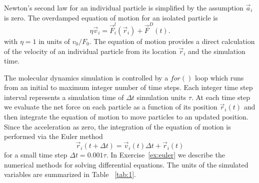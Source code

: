 \documentclass[twocolumn,preprintnumbers,amsmath,amssymb,aps,prx]{revtex4}
\begin{document}
Newton's second law for an individual particle
is simplified
by the assumption $\vec{a}_i$ is zero. %
The overdamped equation of motion for an isolated particle is
\begin{equation}
  \eta \vec{v}_i = \vec{F}^l_{i}(\vec{r}_i) + \vec{F}^{D}(t).
    \label{eq:motion}
\end{equation}
with  $\eta = 1$ in units of $v_0 / F_0$. 
The equation of motion provides a direct calculation of the velocity
of an individual particle from its location $\vec{r}_i$ %
and the simulation time.

The molecular dynamics simulation is controlled by a $for()$ loop
which runs from an initial to maximum integer number of time steps.
Each integer time step interval %
represents a simulation time of $\Delta t$ 
simulation units $\tau$.  %
At each time step
we evaluate the net force on each particle as a function of its position
$\vec{r}_i(t)$
and then integrate
the equation of motion to move particles
to an updated position.
Since the acceleration as zero,
the integration of the equation of motion
is performed via 
the Euler method 
\begin{equation}
  \vec{r}_i(t+\Delta t) = \vec{v}_i(t) \Delta t + \vec{r}_i(t)
    \label{eq:euler}
\end{equation}
for a small time step $\Delta t = 0.001 \tau$.
In %
Exercise~\ref{ex:euler}
we describe 
the numerical methods for 
solving differential equations.
%
The units of the simulated variables are summarized in Table ~\ref{tab:1}.
\end{document}
